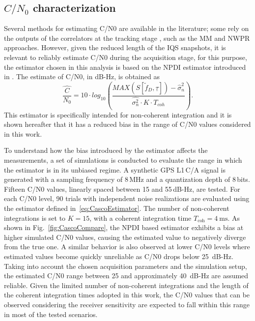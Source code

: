 \documentclass{IEEEtaes}
\begin{document}
\subsection{$C/N_0$ characterization}
Several methods for estimating \gls{C/N0} are available in the literature; some rely on the  outputs of the correlators at the tracking stage \cite{pini2008performance}, such as the \gls{MM} and \gls{NWPR} approaches. However, given the reduced length of the \gls{IQS} snapshots, it is relevant to reliably estimate \gls{C/N0} during the acquisition stage, for this purpose, the estimator chosen in this analysis is based on the \gls{NPDI} estimator introduced  in \cite{gomez2018c}.
%
The estimate of \gls{C/N0}, in dB-Hz, is obtained as
\begin{equation}
    \hat{\frac{{C}}{N_0}} = 10\cdot log_{10} \left( \frac{MAX(S[\tilde f_D, \underline{\tau}])-\hat\sigma^2_n}{\hat{\sigma^2_n}\cdot K\cdot T_{coh}}\right).
    \label{eq:CascoEstimator}
\end{equation}
%
This estimator is specifically intended for non-coherent integration and it is shown hereafter that it has a reduced bias in the range of \gls{C/N0} values considered in this work. 

To understand how the bias introduced by the estimator affects the measurements, a set of simulations is conducted to evaluate the range in which the estimator is in its unbiased regime.
A synthetic GPS L1\,C/A signal is generated with a sampling frequency of $8$\,MHz and a quantization depth of 8\,bits. Fifteen \gls{C/N0} values, linearly spaced between 15 and 55\,dB-Hz, are tested. For each \gls{C/N0} level, 90 trials with independent noise realizations are evaluated using the estimator defined  in~\eqref{eq:CascoEstimator}. The number of non-coherent integrations is set to $K = 15$, with a coherent integration time $T_{\text{coh}} = 4\ \text{ms}$. %
As shown in Fig.~\ref{fig:CascoCompare}, the \gls{NPDI} based estimator exhibits a bias at higher simulated \gls{C/N0} values, causing the estimated value to negatively diverge from the true one. A similar behavior is also observed at lower \gls{C/N0} levels where estimated values become quickly unreliable as \gls{C/N0} drops below 25~dB-Hz. Taking into account the chosen acquisition parameters and the simulation setup, the estimated \gls{C/N0} range between 25 and approximately 40~dB-Hz are assumed reliable. Given the limited number of non-coherent integrations and the length of the coherent integration times adopted in this work, the \gls{C/N0} values that can be observed considering the receiver sensitivity are expected to fall within this range in most of the tested scenarios.  
\end{document}
